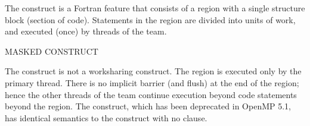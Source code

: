 The  construct is a Fortran feature that consists of a
region with a single structure block (section of code). Statements in the
 region are divided into units of work, and executed (once)
by threads of the team.  

\bigskip
MASKED CONSTRUCT

The  construct is not a worksharing construct.  The  region is
executed only by the primary thread. There is no implicit barrier (and flush) 
at the end of the  region; hence the other threads of the team continue
execution beyond code statements beyond the  region.
The  construct, which has been deprecated in OpenMP 5.1, has identical semantics
to the  construct with no  clause.





















